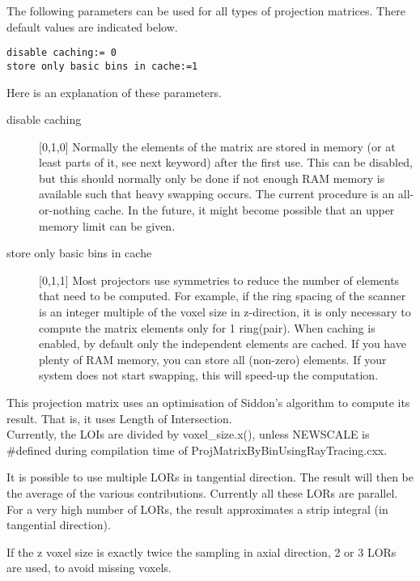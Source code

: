 \documentclass{article}
\begin{document}
{ 
}
\label{sec:projmatrixcommon}
The following parameters can be used for all types of projection 
matrices. There default values are indicated below.

\begin{verbatim}
disable caching:= 0
store only basic bins in cache:=1
\end{verbatim}

Here is an explanation of these parameters.

\begin{description}
\item[disable caching] [0,1,0{]}
Normally the elements of the matrix are stored in memory (or 
at least parts of it, see next keyword) after the first use. 
This can be disabled, but this should normally only be done if 
not enough RAM memory is available such that heavy swapping occurs. 
The current procedure is an all-or-nothing cache. In the future, 
it might become possible that an upper memory limit can be given.


\item[store only basic bins in cache] [0,1,1{]}
Most projectors use symmetries to reduce the number of elements 
that need to be computed. For example, if the ring spacing of 
the scanner is an integer multiple of the voxel size in z-direction, 
it is only necessary to compute the matrix elements only for 
1 ring(pair). When caching is enabled, by default only the independent 
elements are cached. If you have plenty of RAM memory, you can 
store all (non-zero) elements. If your system does not start 
swapping, this will speed-up the computation.
\end{description}

{ 
}
\label{sec:projmatrixusingraytracing}
This projection matrix uses an optimisation of Siddon's algorithm 
to compute its result. That is, it uses Length of Intersection.\\
Currently, the LOIs are divided by voxel\_size.x(), unless NEWSCALE 
is \#defined during compilation time of ProjMatrixByBinUsingRayTracing.cxx. 

It is possible to use multiple LORs in tangential direction. 
The result will then be the average of the various contributions. 
Currently all these LORs are parallel. For a very high number 
of LORs, the result approximates a strip integral (in tangential 
direction).

If the z voxel size is exactly twice the sampling in axial direction, 
2 or 3 LORs are used, to avoid missing voxels. 
\end{document}
